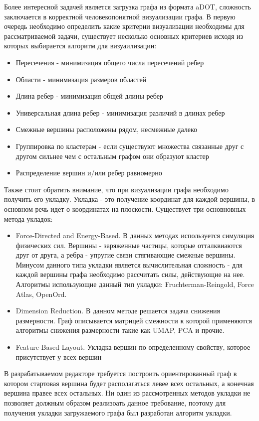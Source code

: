 Более интересной задачей является загрузка графа из формата aDOT, сложность заключается в корректной человекопонятной визуализации графа. В первую очередь необходимо определить какие критерии визуализации необходимы для рассматриваемой задачи, существует несколько основных критериев исходя из которых выбирается алгоритм для визуаилизации:
\begin{itemize}
    \item Пересечения - минимизация общего числа пересечений ребер
    \item Области - минимизация размеров областей
    \item Длина ребер - минимизация общей длины ребер
    \item Универсальная длина ребер - минимизация различий в длинах ребер
    \item Смежные вершины расположены рядом, несмежные далеко
    \item Группировка по кластерам - если существуют множества связанные друг с другом сильнее чем с остальным графом они образуют кластер
    \item Распределение вершин и/или ребер равномерно
\end{itemize}
Также стоит обратить внимание, что при визуализации графа необходимо получить его укладку. Укладка - это получение координат для каждой вершины, в основном речь идет о координатах на плоскости. Существует три основновных метода укладок:
\begin{itemize}
    \item Force-Directed and Energy-Based. В данных методах используется симуляция физических сил. Вершины - заряженные частицы, которые отталквиаются друг от друга, а ребра - упругие связи стягивающие смежные вершины. Минусом данного типа укладки является вычислительная сложность - для каждой вершины графа необходимо рассчитать силы, действующие на нее. Алгоритмы использующие данный тип укладки: Fruchterman-Reingold, Force Atlas, OpenOrd.
    \item Dimension Reduction. В данном методе решается задача снижения размерности. Граф описывается матрицей смежности к которой применяются алгоритмы снижения размерности такие как UMAP, PCA и прочие.
    \item Feature-Based Layout. Укладка вершин по определенному свойству, которое присутствует у всех вершин
\end{itemize}

В разрабатываемом редакторе требуется построить ориентированный граф в котором стартовая вершина будет располагаться левее всех остальных, а конечная вершина правее всех остальных. Ни один из рассмотренных методов укладки не позволяет должным образом реализоать данное требование, поэтому для получения укладки загружаемого графа был разработан алгоритм укладки.

